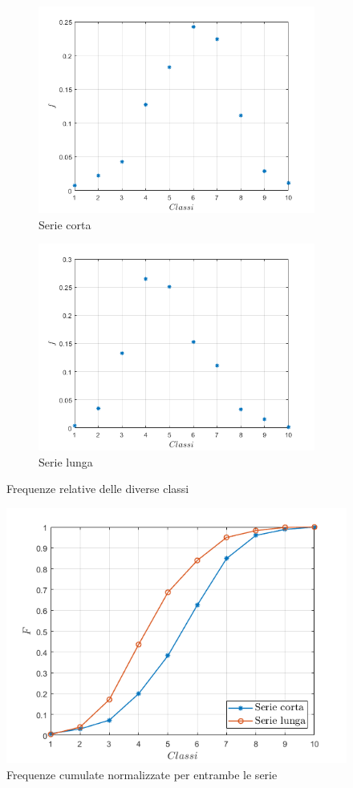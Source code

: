 \begin{figure}
	
	\begin{subfigure}{0.5\textwidth}
		\centering
		\includegraphics[width=\linewidth]{chapters/1-misureT/relshort}
		\caption{Serie corta}
		\label{fig:relshort}
	\end{subfigure}%
	\begin{subfigure}{0.5\textwidth}
		\centering
		\includegraphics[width=\linewidth]{chapters/1-misureT/rellong}
		\caption{Serie lunga}
		\label{fig:rellong}
	\end{subfigure}
	\caption{Frequenze relative delle diverse classi}
	\label{fig:relboth}
\end{figure}

\begin{figure}
	\centering
	\includegraphics[width=0.7\linewidth]{chapters/1-misureT/cumboth}
	\caption{Frequenze cumulate normalizzate per entrambe le serie}
	\label{fig:cumboth}
\end{figure}
